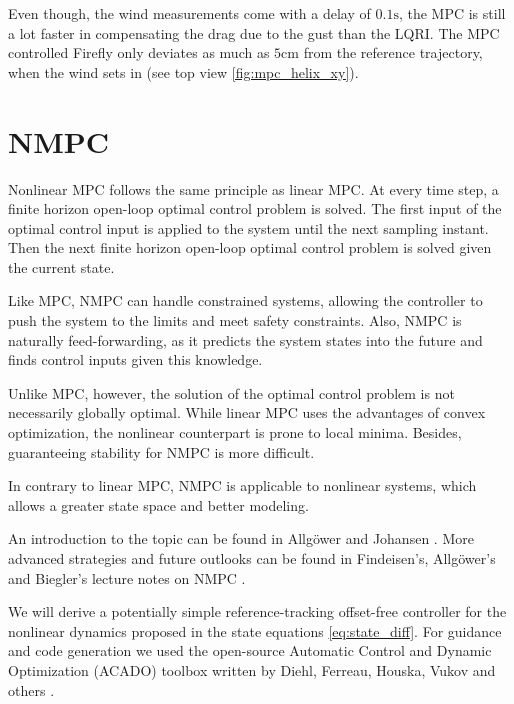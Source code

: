 Even though, the wind measurements come with a delay of $0.1 \si{\second}$, the MPC is still a lot faster in compensating the drag due to the gust than the LQRI. The MPC controlled Firefly only deviates as much as $5\si{\centi\metre}$ from the reference trajectory, when the wind sets in (see top view \ref{fig:mpc_helix_xy}).%
\section{NMPC} 
Nonlinear MPC follows the same principle as linear MPC. At every time step, a finite horizon open-loop optimal control problem is solved. The first input of the optimal control input is applied to the system until the next sampling instant. Then the next finite horizon open-loop optimal control problem is solved given the current state.

Like MPC, NMPC can handle constrained systems, allowing the controller to push the system to the limits and meet safety constraints. Also, NMPC is naturally feed-forwarding, as it predicts the system states into the future and finds control inputs given this knowledge. 

Unlike MPC, however, the solution of the optimal control problem is not necessarily globally optimal. While linear MPC uses the advantages of convex optimization, the nonlinear counterpart is prone to local minima. Besides, guaranteeing stability for NMPC is more difficult. 

In contrary to linear MPC, NMPC is applicable to nonlinear systems, which allows a greater state space and better modeling.

An introduction to the topic can be found in Allgöwer and Johansen \cite{Allgower2004,Johansen2011}. More advanced strategies and future outlooks can be found in Findeisen's, Allgöwer's and Biegler's lecture notes on NMPC \cite{Findeisen2007}.

We will derive a potentially simple reference-tracking offset-free controller for the nonlinear dynamics proposed in the state equations \ref{eq:state_diff}. For guidance and code generation we used the open-source Automatic Control and Dynamic Optimization (ACADO) toolbox written by Diehl, Ferreau, Houska, Vukov and others \cite{Houska2011,Vukov2013}.

